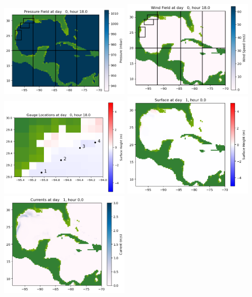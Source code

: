 \documentclass[11pt]{article}
\begin{document}
\includegraphics[width=0.475\textwidth]{frame0015fig1006.png}
\vskip 10pt 
\includegraphics[width=0.475\textwidth]{frame0015fig1007.png}
\includegraphics[width=0.475\textwidth]{frame0015fig1008.png}
\vskip 10pt 
\includegraphics[width=0.475\textwidth]{frame0016fig1001.png}
\includegraphics[width=0.475\textwidth]{frame0016fig1002.png}
\end{document}
